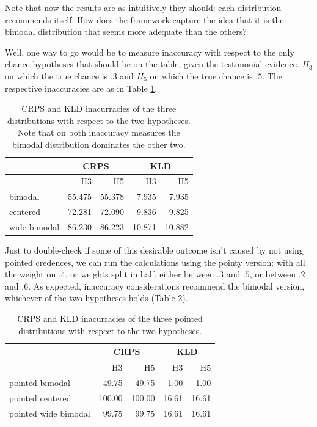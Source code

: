 \documentclass[
  10pt,
  dvipsnames,enabledeprecatedfontcommands]{scrartcl}
\begin{document}
Note that now the results are as intuitively they should: each
distribution recommends itself. How does the framework capture the idea
that it is the bimodal distribution that seems more adequate than the
others?

Well, one way to go would be to measure inaccuracy with respect to the
only chance hypotheses that should be on the table, given the
testimonial evidence. \(H_3\) on which the true chance is \(.3\) and
\(H_5\) on which the true chance is \(.5\). The respective inaccuracies
are as in Table \ref{tab:schoen}.

\begin{table}[H]
\begin{tabular}{lrrrr}
 & \multicolumn{2}{c}{CRPS} & \multicolumn{2}{c}{KLD} \\
\toprule
&H3 & H5 & H3 & H5\\
\midrule
bimodal &55.475 & 55.378 & 7.935 & 7.935\\
centered &72.281 & 72.090 & 9.836 & 9.825\\
wide bimodal & 86.230 & 86.223 & 10.871 & 10.882\\
\bottomrule
\end{tabular}
\caption{CRPS and KLD inacurracies of the three distributions with respect to the two hypotheses.
 Note that on both inaccuracy measures the bimodal distribution dominates the other two.}
\label{tab:schoen}
\end{table}

Just to double-check if some of this desirable outcome isn't caused by
not using pointed credences, we can run the calculations using the
pointy version: with all the weight on .4, or weights split in half,
either between \(.3\) and \(.5\), or between \(.2\) and \(.6\). As
expected, inaccuracy considerations recommend the bimodal version,
whichever of the two hypotheses holds (Table \ref{tab:schoen2}).

\begin{table}[H]
\begin{tabular}{lrrrr}
 & \multicolumn{2}{c}{CRPS} & \multicolumn{2}{c}{KLD} \\
\toprule
 &H3 & H5 & H3 & H5\\ \midrule
pointed bimodal &49.75 & 49.75 & 1.00 & 1.00\\
pointed centered &100.00 & 100.00 & 16.61 & 16.61\\
pointed wide bimodal & 99.75 & 99.75 & 16.61 & 16.61\\
\bottomrule
\end{tabular}
\caption{CRPS and KLD inacurracies of the three pointed distributions with respect to the two hypotheses.}
\label{tab:schoen2}
\end{table}
\end{document}
